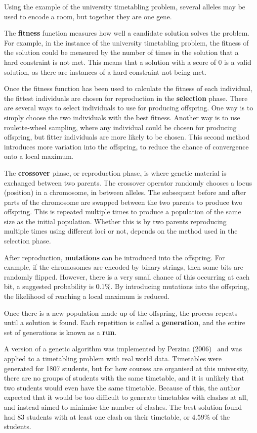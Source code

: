 \documentclass[a4paper, 12pt]{report}
\begin{document}
Using the example of the university timetabling problem, several alleles may be
used to encode a room, but together they are one gene.

The \textbf{fitness} function measures how well a candidate solution solves the
problem.
For example, in the instance of the university timetabling problem, the fitness 
of the solution could be measured by the number of times in the solution that a
hard constraint is not met.
This means that a solution with a score of 0 is a valid solution, as there are
instances of a hard constraint not being met.

Once the fitness function has been used to calculate the fitness of each
individual, the fittest individuals are chosen for reproduction in the
\textbf{selection} phase.
There are several ways to select individuals to use for producing offspring.
One way is to simply choose the two individuals with the best fitness.
Another way is to use roulette-wheel sampling, where any individual could be
chosen for producing offspring, but fitter individuals are more likely to be
chosen.
This second method introduces more variation into the offspring, to reduce the
chance of convergence onto a local maximum.

The \textbf{crossover} phase, or reproduction phase, is where genetic material
is exchanged between two parents.
The crossover operator randomly chooses a locus (position) in a chromosome,
in between alleles.
The subsequent before and after parts of the chromosome are swapped between the
two parents to produce two offspring.
This is repeated multiple times to produce a population of the same size as the
initial population.
Whether this is by two parents reproducing multiple times using different loci
or not, depends on the method used in the selection phase.

After reproduction, \textbf{mutations} can be introduced into the offspring. 
For example, if the chromosomes are encoded by binary strings, then some bits 
are randomly flipped.
However, there is a very small chance of this occurring at each bit, a suggested
probability is 0.1\%.
By introducing mutations into the offspring, the likelihood of reaching a local
maximum is reduced.

Once there is a new population made up of the offspring, the process repeats 
until a solution is found.
Each repetition is called a \textbf{generation}, and the entire set of
generations is known as a \textbf{run}.

A version of a genetic algorithm was implemented by Perzina 
(2006)~\cite{ga_example} and was applied to a timetabling problem with real 
world data.
Timetables were generated for 1807 students, but for how courses are organised 
at this university, there are no groups of students with the same timetable, and
it is unlikely that two students would even have the same timetable.
Because of this, the author expected that it would be too difficult to generate
timetables with clashes at all, and instead aimed to minimise the number of
clashes.
The best solution found had 83 students with at least one clash on their
timetable, or 4.59\% of the students.
\end{document}
